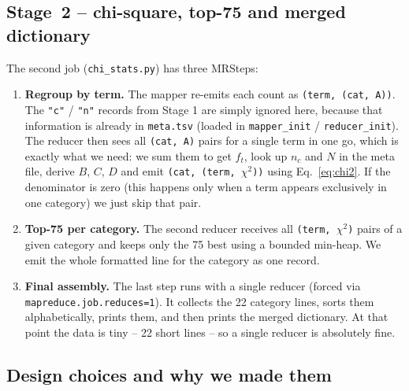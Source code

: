 \documentclass[11pt,a4paper]{article}
\begin{document}
\subsection{Stage~2 -- chi-square, top-75 and merged dictionary}

The second job (\texttt{chi\_stats.py}) has three MRSteps:

\begin{enumerate}
    \item \textbf{Regroup by term.} The mapper re-emits each count as
          \texttt{(term, (cat, A))}. The \texttt{"c"} / \texttt{"n"}
          records from Stage 1 are simply ignored here, because that
          information is already in \texttt{meta.tsv} (loaded in
          \texttt{mapper\_init} / \texttt{reducer\_init}). The reducer
          then sees all \texttt{(cat, A)} pairs for a single term in
          one go, which is exactly what we need: we sum them to get
          $f_t$, look up $n_c$ and $N$ in the meta file, derive
          $B$, $C$, $D$ and emit \texttt{(cat, (term, $\chi^2$))}
          using Eq.~\eqref{eq:chi2}. If the denominator is zero (this
          happens only when a term appears exclusively in one
          category) we just skip that pair.
    \item \textbf{Top-75 per category.} The second reducer receives
          all \texttt{(term, $\chi^2$)} pairs of a given category and
          keeps only the 75 best using a bounded min-heap. We emit
          the whole formatted line for the category as one record.
    \item \textbf{Final assembly.} The last step runs with a single
          reducer (forced via \texttt{mapreduce.job.reduces=1}). It
          collects the 22 category lines, sorts them alphabetically,
          prints them, and then prints the merged dictionary. At that
          point the data is tiny -- 22 short lines -- so a single
          reducer is absolutely fine.
\end{enumerate}

\subsection{Design choices and why we made them}
\end{document}

